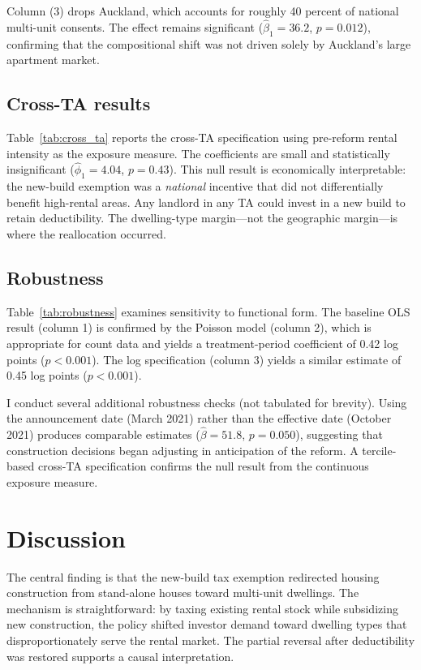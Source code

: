 \documentclass[12pt]{article}
\begin{document}
Column (3) drops Auckland, which accounts for roughly 40 percent of national multi-unit consents. The effect remains significant ($\hat{\beta}_1 = 36.2$, $p = 0.012$), confirming that the compositional shift was not driven solely by Auckland's large apartment market.

\subsection{Cross-TA results}



Table~\ref{tab:cross_ta} reports the cross-TA specification using pre-reform rental intensity as the exposure measure. The coefficients are small and statistically insignificant ($\hat{\phi}_1 = 4.04$, $p = 0.43$). This null result is economically interpretable: the new-build exemption was a \textit{national} incentive that did not differentially benefit high-rental areas. Any landlord in any TA could invest in a new build to retain deductibility. The dwelling-type margin---not the geographic margin---is where the reallocation occurred.

\subsection{Robustness}



Table~\ref{tab:robustness} examines sensitivity to functional form. The baseline OLS result (column 1) is confirmed by the Poisson model (column 2), which is appropriate for count data and yields a treatment-period coefficient of 0.42 log points ($p < 0.001$). The log specification (column 3) yields a similar estimate of 0.45 log points ($p < 0.001$).

I conduct several additional robustness checks (not tabulated for brevity). Using the announcement date (March 2021) rather than the effective date (October 2021) produces comparable estimates ($\hat{\beta} = 51.8$, $p = 0.050$), suggesting that construction decisions began adjusting in anticipation of the reform. A tercile-based cross-TA specification confirms the null result from the continuous exposure measure.


\section{Discussion}
\label{sec:discussion}

The central finding is that the new-build tax exemption redirected housing construction from stand-alone houses toward multi-unit dwellings. The mechanism is straightforward: by taxing existing rental stock while subsidizing new construction, the policy shifted investor demand toward dwelling types that disproportionately serve the rental market. The partial reversal after deductibility was restored supports a causal interpretation.
\end{document}
